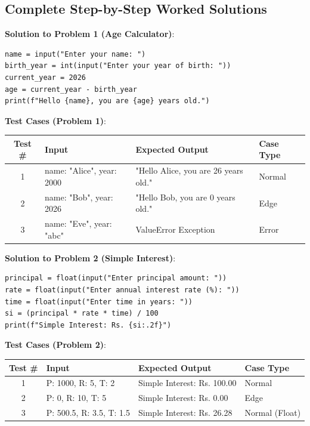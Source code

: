 \subsection{Complete Step-by-Step Worked Solutions}

\begin{solutionbox}

\noindent\textbf{Solution to Problem 1 (Age Calculator)}:
\begin{lstlisting}[language=Python3]
name = input("Enter your name: ")
birth_year = int(input("Enter your year of birth: "))
current_year = 2026
age = current_year - birth_year
print(f"Hello {name}, you are {age} years old.")
\end{lstlisting}
\vspace{4pt}
\noindent\textbf{Test Cases (Problem 1)}:

\noindent\begin{tabular}{|c|p{4cm}|p{4.5cm}|p{2.2cm}|}
\hline
\textbf{Test \#} & \textbf{Input} & \textbf{Expected Output} & \textbf{Case Type} \\
\hline
1 & name: "Alice", year: 2000 & "Hello Alice, you are 26 years old." & Normal \\
2 & name: "Bob", year: 2026 & "Hello Bob, you are 0 years old." & Edge \\
3 & name: "Eve", year: "abc" & ValueError Exception & Error \\
\hline
\end{tabular}
\vspace{8pt}

\noindent\textbf{Solution to Problem 2 (Simple Interest)}:
\begin{lstlisting}[language=Python3]
principal = float(input("Enter principal amount: "))
rate = float(input("Enter annual interest rate (%): "))
time = float(input("Enter time in years: "))
si = (principal * rate * time) / 100
print(f"Simple Interest: Rs. {si:.2f}")
\end{lstlisting}
\vspace{4pt}
\noindent\textbf{Test Cases (Problem 2)}:

\noindent\begin{tabular}{|c|p{4cm}|p{4.5cm}|p{2.2cm}|}
\hline
\textbf{Test \#} & \textbf{Input} & \textbf{Expected Output} & \textbf{Case Type} \\
\hline
1 & P: 1000, R: 5, T: 2 & Simple Interest: Rs. 100.00 & Normal \\
2 & P: 0, R: 10, T: 5 & Simple Interest: Rs. 0.00 & Edge \\
3 & P: 500.5, R: 3.5, T: 1.5 & Simple Interest: Rs. 26.28 & Normal (Float) \\
\hline
\end{tabular}
\vspace{8pt}


\end{solutionbox}
